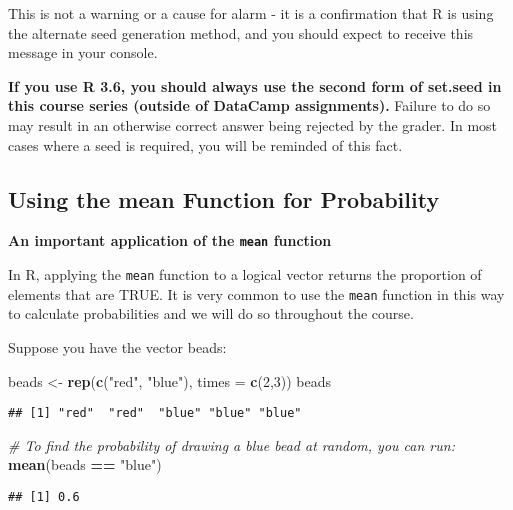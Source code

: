 \documentclass[
]{article}
\newenvironment{Shaded}{\begin{snugshade}}{\end{snugshade}}
\newcommand{\CommentTok}[1]{\textcolor[rgb]{0.56,0.35,0.01}{\textit{#1}}}
\newcommand{\DataTypeTok}[1]{\textcolor[rgb]{0.13,0.29,0.53}{#1}}
\newcommand{\DecValTok}[1]{\textcolor[rgb]{0.00,0.00,0.81}{#1}}
\newcommand{\KeywordTok}[1]{\textcolor[rgb]{0.13,0.29,0.53}{\textbf{#1}}}
\newcommand{\NormalTok}[1]{#1}
\newcommand{\OperatorTok}[1]{\textcolor[rgb]{0.81,0.36,0.00}{\textbf{#1}}}
\newcommand{\StringTok}[1]{\textcolor[rgb]{0.31,0.60,0.02}{#1}}
\begin{document}
This is not a warning or a cause for alarm - it is a confirmation that R
is using the alternate seed generation method, and you should expect to
receive this message in your console.

\textbf{If you use R 3.6, you should always use the second form of
set.seed in this course series (outside of DataCamp assignments).}
Failure to do so may result in an otherwise correct answer being
rejected by the grader. In most cases where a seed is required, you will
be reminded of this fact.

\hypertarget{using-the-mean-function-for-probability}{%
\subsection{Using the mean Function for
Probability}\label{using-the-mean-function-for-probability}}

\textbf{An important application of the \texttt{mean} function}

In R, applying the \texttt{mean} function to a logical vector returns
the proportion of elements that are TRUE. It is very common to use the
\texttt{mean} function in this way to calculate probabilities and we
will do so throughout the course.

Suppose you have the vector beads:

\begin{Shaded}
\begin{Highlighting}[]
\NormalTok{beads <-}\StringTok{ }\KeywordTok{rep}\NormalTok{(}\KeywordTok{c}\NormalTok{(}\StringTok{"red"}\NormalTok{, }\StringTok{"blue"}\NormalTok{), }\DataTypeTok{times =} \KeywordTok{c}\NormalTok{(}\DecValTok{2}\NormalTok{,}\DecValTok{3}\NormalTok{))}
\NormalTok{beads}
\end{Highlighting}
\end{Shaded}

\begin{verbatim}
## [1] "red"  "red"  "blue" "blue" "blue"
\end{verbatim}

\begin{Shaded}
\begin{Highlighting}[]
\CommentTok{# To find the probability of drawing a blue bead at random, you can run:}
\KeywordTok{mean}\NormalTok{(beads }\OperatorTok{==}\StringTok{ "blue"}\NormalTok{)}
\end{Highlighting}
\end{Shaded}

\begin{verbatim}
## [1] 0.6
\end{verbatim}
\end{document}
